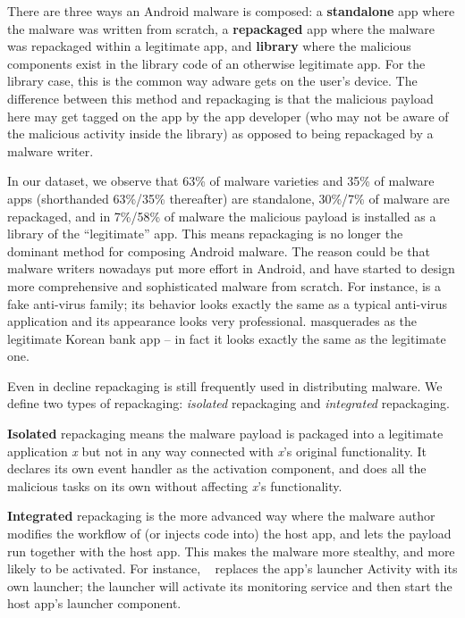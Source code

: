 There are three ways an Android malware is composed: a {\bf standalone} app where the 
malware was written from scratch, a {\bf repackaged} app where the malware was repackaged
within a legitimate app, and {\bf library} where the malicious components exist in the
library code of an otherwise legitimate app.
For the library case, 
this is the common way adware gets on the user's device.
The difference between this method and repackaging is that the malicious payload here
may get tagged on the app by the app developer (who may not be aware of the malicious
activity inside the library) as opposed to being repackaged by a malware writer.

In our dataset, we observe that 63\% of malware varieties and 35\% of malware apps 
(shorthanded 63\%/35\% thereafter) are standalone, 30\%/7\% of malware are repackaged,
and in 7\%/58\% of malware the malicious payload is installed 
as a library of the ``legitimate'' app.
This means repackaging is no longer the dominant method for composing Android malware.
The reason could be that malware writers nowadays put more effort in Android, 
and have started to design more comprehensive and sophisticated malware from scratch.
For instance,  is a fake anti-virus family; its behavior
looks exactly the same as a typical anti-virus application and
its appearance looks very professional.
 masquerades as the legitimate Korean bank app -- in fact
it looks exactly the same as the legitimate one.

Even in decline repackaging is still frequently used in distributing malware. 
We define two types of repackaging: 
\emph{isolated} repackaging and \emph{integrated} repackaging.

{\bf Isolated} repackaging means the malware payload
is packaged into a legitimate application \emph{x} but not in any way connected 
with \emph{x}'s original functionality.
It declares its own event handler as the activation component,
and does all the malicious tasks on its own without affecting \emph{x}'s functionality.

{\bf Integrated} repackaging is the more advanced way
where the malware author modifies the workflow of
(or injects code into) the host app, and lets the payload run together with the host app.
This makes the malware more stealthy,
and more likely to be activated.
For instance, ~\cite{vikingHorde} replaces the app's launcher Activity with its own launcher;
the launcher will activate its monitoring service and then start
the host app's launcher component. 


